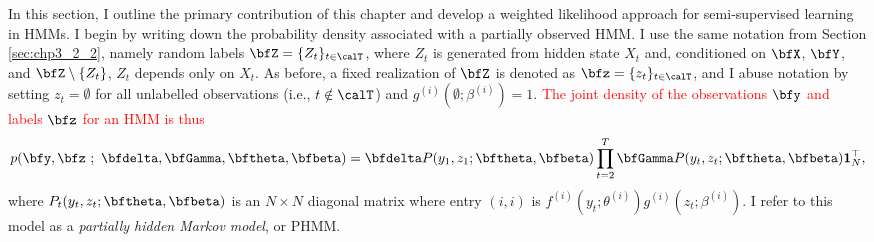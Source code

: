 
In this section, I outline the primary contribution of this chapter and develop a weighted likelihood approach for semi-supervised learning in HMMs. %
I begin by writing down the probability density associated with a partially observed HMM. I use the same notation from Section \ref{sec:chp3_2_2}, namely random labels $\bfZ = \{Z_t\}_{t \in \calT}$, where $Z_t$ is generated from hidden state $X_t$ and, conditioned on $\bfX$, $\bfY$, and $\bfZ \setminus \{Z_t\}$, $Z_t$ depends only on $X_t$. As before, a fixed realization of $\bfZ$ is denoted as $\bfz = \{z_t\}_{t \in \calT}$, and I abuse notation by setting $z_t = \emptyset$ for all unlabelled observations (i.e., $t \notin \calT$) and $g^{(i)}(\emptyset ; \beta^{(i)}) = 1$. \textcolor{red}{The joint density of the observations $\bfy$ and labels $\bfz$ for an HMM is thus}
%
\begin{equation}
    p(\bfy,\bfz ~;~ \bfdelta, \bfGamma, \bftheta,\bfbeta) = \bfdelta P(y_1,z_1;\bftheta,\bfbeta) \prod_{t=2}^T \bfGamma P(y_t,z_t;\bftheta,\bfbeta) \mathbf{1}^\top_N, \label{eqn:PHMM_like}
\end{equation}
%
where $P_t(y_t,z_t;\bftheta,\bfbeta)$ is an $N \times N$ diagonal matrix where entry $(i,i)$ is $f^{(i)}(y_t; \theta^{(i)}) g^{(i)}(z_t; \beta^{(i)})$. I refer to this model as a \textit{partially hidden Markov model}, or PHMM.

